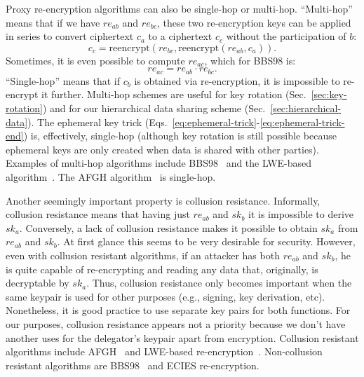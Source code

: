 \documentclass[longbibliography,nofootinbib]{revtex4-1}
\begin{document}
Proxy re-encryption algorithms can also be single-hop or multi-hop.
``Multi-hop'' means that if we have $re_{ab}$ and $re_{bc}$, these two re-encryption keys can be applied in series to convert ciphertext $c_a$ to a ciphertext
$c_c$ without the participation of $b$:
\begin{equation}
    c_c = \text{reencrypt}(re_{bc}, \text{reencrypt}(re_{ab}, c_a)).
\end{equation}
Sometimes, it is even possible to compute $re_{ac}$, which for BBS98 is:
\begin{equation}
    re_{ac} = re_{ab} \cdot re_{bc}.
\end{equation}
``Single-hop'' means that if $c_b$ is obtained via re-encryption, it is impossible to re-encrypt it further.
Multi-hop schemes are useful for key rotation (Sec.~\ref{sec:key-rotation}) and for our hierarchical data sharing scheme (Sec.~\ref{sec:hierarchical-data}).
The ephemeral key trick (Eqs.~\ref{eq:ephemeral-trick}-\ref{eq:ephemeral-trick-end}) is, effectively, single-hop
(although key rotation is still possible because ephemeral keys are only created when data is shared with other parties).
Examples of multi-hop algorithms include BBS98~\cite{BBS98} and the LWE-based algorithm~\cite{lwe-reencryption}.
The AFGH algorithm~\cite{AFGH} is single-hop.

Another seemingly important property is collusion resistance.
Informally, collusion resistance means that having just $re_{ab}$ and $sk_b$ it is impossible to derive $sk_a$.
Conversely, a lack of collusion resistance makes it possible to obtain $sk_a$ from $re_{ab}$ and $sk_b$.
At first glance this seems to be very desirable for security.
However, even with collusion resistant algorithms, if an attacker has both $re_{ab}$ and $sk_b$, he is quite capable of re-encrypting and reading any data that, originally, is decryptable by $sk_a$.
Thus, collusion resistance only becomes important when the same keypair is used for other purposes (e.g., signing, key derivation, etc). Nonetheless, it is good practice to use separate key pairs for both functions.
For our purposes, collusion resistance appears not a priority because we don't have another uses for the delegator's keypair apart from encryption. %
Collusion resistant algorithms include AFGH~\cite{AFGH} and LWE-based re-encryption~\cite{lwe-reencryption}.
Non-collusion resistant algorithms are BBS98~\cite{BBS98} and ECIES re-encryption.
\end{document}

